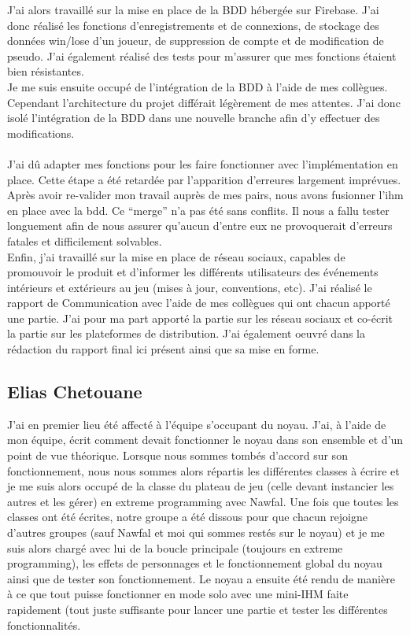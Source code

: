\documentclass[a4paper,11pt]{article}
\begin{document}
J’ai alors travaillé sur la mise en place de la BDD hébergée sur Firebase. J’ai donc réalisé les fonctions d’enregistrements et de connexions, de stockage des données win/lose d’un joueur, de suppression de compte et de modification de pseudo. J’ai également réalisé des tests pour m’assurer que mes fonctions étaient bien résistantes. \\

Je me suis ensuite occupé de l’intégration de la BDD à l’aide de mes collègues. Cependant l’architecture du projet différait légèrement de mes attentes. J’ai donc isolé l’intégration de la BDD dans une nouvelle branche afin d’y effectuer des modifications. \\\\

 J’ai dû adapter mes fonctions pour les faire fonctionner avec l’implémentation en place. Cette étape a été retardée par l’apparition d’erreures largement imprévues.
Après avoir re-valider mon travail auprès de mes pairs, nous avons fusionner l’ihm en place avec la bdd. Ce “merge” n’a pas été sans conflits. Il nous a fallu tester longuement afin de nous assurer qu’aucun d’entre eux ne provoquerait d’erreurs fatales et difficilement solvables. \\
 
  Enfin, j’ai travaillé sur la mise en place de réseau sociaux, capables de promouvoir le produit et d’informer les différents utilisateurs des événements intérieurs et extérieurs au jeu (mises à jour, conventions, etc). J’ai réalisé le rapport de Communication avec l’aide de mes collègues qui ont chacun apporté une partie. J’ai pour ma part apporté la partie sur les réseau sociaux et co-écrit la partie sur les plateformes de distribution. J’ai également oeuvré dans la rédaction du rapport final ici présent ainsi que sa mise en forme. \\
  
\subsection{Elias Chetouane}

J’ai en premier lieu été affecté à l’équipe s’occupant du noyau. J’ai, à l’aide de mon équipe, écrit comment devait fonctionner le noyau dans son ensemble et d’un point de vue théorique. Lorsque nous sommes tombés d’accord sur son fonctionnement, nous nous sommes alors répartis les différentes classes à écrire et je me suis alors occupé de la classe du plateau de jeu (celle devant instancier les autres et les gérer) en extreme programming avec Nawfal. Une fois que toutes les classes ont été écrites, notre groupe a été dissous pour que chacun rejoigne d’autres groupes (sauf Nawfal et moi qui sommes restés sur le noyau) et je me suis alors chargé avec lui de la boucle principale (toujours en extreme programming), les effets de personnages et le fonctionnement global du noyau ainsi que de tester son fonctionnement. Le noyau a ensuite été rendu de manière à ce que tout puisse fonctionner en mode solo avec une mini-IHM faite rapidement (tout juste suffisante pour lancer une partie et tester les différentes fonctionnalités. \\
\end{document}
